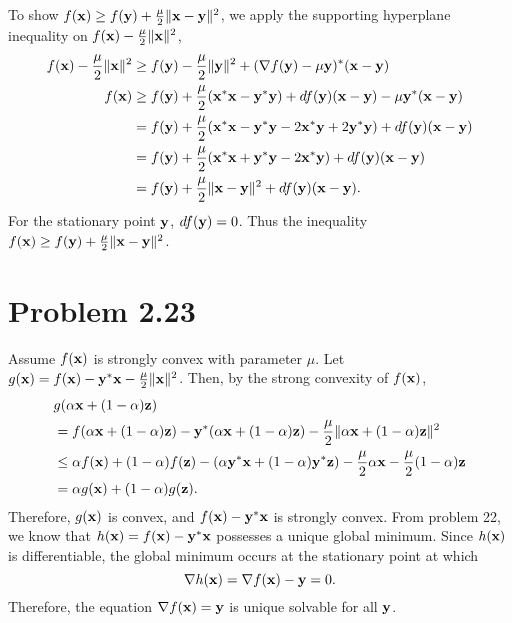 \documentclass{scrartcl}
\begin{document}
To show $f(\mathbf{x}) \ge f(\mathbf{y})+{\mu \over 2} \| \mathbf{x} - \mathbf{y} \|^2$, we apply
the supporting hyperplane inequality on $f(\mathbf{x})-{\mu \over 2}\|\mathbf{x}\|^2$,
\begin{equation}
	\begin{split}
	f(\mathbf{x})-{\mu \over 2}\|\mathbf{x}\|^2
	& \ge f(\mathbf{y})-{\mu \over 2}\|\mathbf{y}\|^2+(\nabla f(\mathbf{y})-\mu \mathbf{y})^*(\mathbf{x}-\mathbf{y}) \\
	f(\mathbf{x}) & \ge f(\mathbf{y})+{\mu \over 2}(\mathbf{x}^*\mathbf{x}-\mathbf{y}^*\mathbf{y})
	  +df(\mathbf{y})(\mathbf{x}-\mathbf{y})-\mu \mathbf{y}^*(\mathbf{x}-\mathbf{y})\\
	& = f(\mathbf{y}) + {\mu \over 2}(\mathbf{x}^*\mathbf{x}-\mathbf{y}^*\mathbf{y}-2\mathbf{x}^*\mathbf{y}+2\mathbf{y}^*\mathbf{y})
	  + df(\mathbf{y})(\mathbf{x}-\mathbf{y}) \\
	& = f(\mathbf{y}) + {\mu \over 2}(\mathbf{x}^*\mathbf{x}+\mathbf{y}^*\mathbf{y}-2\mathbf{x}^*\mathbf{y})
	  +df(\mathbf{y})(\mathbf{x}-\mathbf{y}) \\
	& = f(\mathbf{y}) + {\mu \over 2}\|\mathbf{x}-\mathbf{y}\|^2+df(\mathbf{y})(\mathbf{x}-\mathbf{y}).
	\end{split}
\end{equation}
For the stationary point $\mathbf{y}$, $df(\mathbf{y}) = 0$. Thus the inequality
$f(\mathbf{x}) \ge f(\mathbf{y})+{\mu \over 2} \| \mathbf{x} - \mathbf{y} \|^2$.



\section*{Problem 2.23}

Assume $f(\mathbf{x})$ is strongly convex with parameter $\mu$.
Let $g(\mathbf{x}) = f(\mathbf{x})-\mathbf{y}^*\mathbf{x}-{\mu \over 2}\|\mathbf{x}\|^2$.
Then, by the strong convexity of $f(\mathbf{x})$,
\begin{equation}
	\begin{split}
		& g(\alpha \mathbf{x} + (1-\alpha) \mathbf{z}) \\
		& = f(\alpha \mathbf{x} + (1-\alpha) \mathbf{z})-\mathbf{y}^*(\alpha \mathbf{x} + (1-\alpha) \mathbf{z}) 
		    - {\mu \over 2}\| \alpha \mathbf{x} + (1-\alpha) \mathbf{z} \|^2 \\
		& \le \alpha f(\mathbf{x}) + (1-\alpha) f(\mathbf{z})
		  -(\alpha \mathbf{y}^*\mathbf{x}+(1-\alpha) \mathbf{y}^*\mathbf{z})
		  -{\mu \over 2} \alpha \mathbf{x} - {\mu \over 2} (1-\alpha) \mathbf{z} \\
		& = \alpha g(\mathbf{x}) + (1-\alpha) g(\mathbf{z}) .
	\end{split}
\end{equation}
Therefore, $g(\mathbf{x})$ is convex, and $f(\mathbf{x})-\mathbf{y}^*\mathbf{x}$ is strongly convex.
From problem 22, we know that $h(\mathbf{x}) = f(\mathbf{x})-\mathbf{y}^*\mathbf{x}$
possesses a unique global minimum. Since $h(\mathbf{x})$ is differentiable, the global
minimum occurs at the stationary point at which
\begin{equation}
	\nabla h(\mathbf{x}) = \nabla f(\mathbf{x}) - \mathbf{y} = 0.
\end{equation}
Therefore, the equation $\nabla f(\mathbf{x}) = \mathbf{y}$ is unique solvable for all $\mathbf{y}$.
\end{document}
